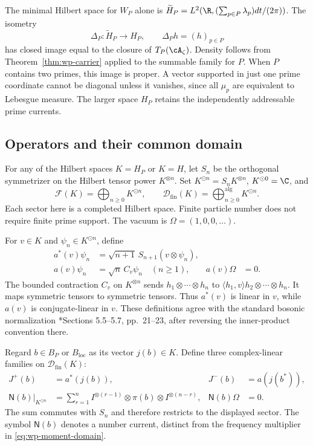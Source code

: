 The minimal Hilbert space for $W_P$ alone is
$\widetilde H_P=L^2(\R,(\sum_{p\in P}\lambda_p)dt/(2\pi))$.
The isometry
\[
 \Delta_P:\widetilde H_P\longrightarrow H_P,\qquad
 \Delta_Ph=(h)_{p\in P}
\]
has closed image equal to the closure of $T_P(\cA_\zeta)$.
Density follows from Theorem~\ref{thm:wp-carrier} applied to the summable
family for $P$.
When $P$ contains two primes, this image is proper.
A vector supported in just one prime coordinate cannot be diagonal
unless it vanishes, since all $\mu_p$ are equivalent to Lebesgue measure.
The larger space $H_P$ retains the independently addressable prime currents.

\subsection{Operators and their common domain}

For any of the Hilbert spaces $K=H_P$ or $K=H$, let $S_n$ be the
orthogonal symmetrizer on the Hilbert tensor power $K^{\otimes n}$.
Set $K^{\odot n}=S_nK^{\otimes n}$, $K^{\odot0}=\C$, and
\begin{equation}
 \mathcal F(K)=\bigoplus_{n\geq0}K^{\odot n},\qquad
 \mathcal D_{\mathrm{fin}}(K)
 =\bigoplus_{n\geq0}^{\mathrm{alg}}K^{\odot n}.
 \label{eq:wc-fock-domain}
\end{equation}
Each sector here is a completed Hilbert space.
Finite particle number does not require finite prime support.
The vacuum is $\Omega=(1,0,0,\ldots)$.

For $v\in K$ and $\psi_n\in K^{\odot n}$, define
\begin{equation}
 \begin{aligned}
 a^*(v)\psi_n&=\sqrt{n+1}\,S_{n+1}(v\otimes\psi_n),\\
 a(v)\psi_n&=\sqrt n\,C_v\psi_n\quad(n\geq1),&
 a(v)\Omega&=0.
 \end{aligned}
 \label{eq:wc-creation-definition}
\end{equation}
The bounded contraction $C_v$ on $K^{\otimes n}$ sends
$h_1\otimes\cdots\otimes h_n$ to
$\langle h_1,v\rangle h_2\otimes\cdots\otimes h_n$.
It maps symmetric tensors to symmetric tensors.
Thus $a^*(v)$ is linear in $v$, while $a(v)$ is conjugate-linear in $v$.
These definitions agree with the standard bosonic normalization
\cite{wc-Derezinski}*{Sections 5.5--5.7, pp.~21--23}, after reversing
the inner-product convention there.

Regard $b\in B_P$ or $B_{\mathrm{loc}}$ as its vector $j(b)\in K$.
Define three complex-linear families on $\mathcal D_{\mathrm{fin}}(K)$:
\begin{equation}
 \begin{aligned}
 J^+(b)&=a^*(j(b)),&
 J^-(b)&=a(j(b^*)),\\
 \mathsf N(b)|_{K^{\odot n}}
 &=\sum_{r=1}^n
 I^{\otimes(r-1)}\otimes\pi(b)\otimes I^{\otimes(n-r)},&
 \mathsf N(b)\Omega&=0.
 \end{aligned}
 \label{eq:wc-current-definition}
\end{equation}
The sum commutes with $S_n$ and therefore restricts to the displayed sector.
The symbol $\mathsf N(b)$ denotes a number current, distinct from the
frequency multiplier in \eqref{eq:wp-moment-domain}.

